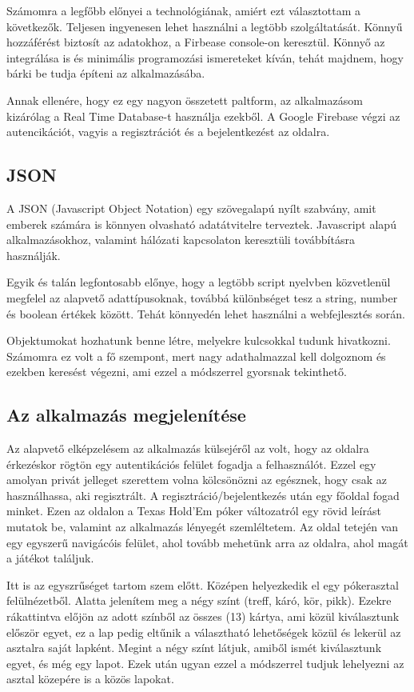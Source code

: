 Számomra a legfőbb előnyei a technológiának, amiért ezt választottam a következők. Teljesen ingyenesen lehet használni a legtöbb szolgáltatását. Könnyű hozzáférést biztosít az adatokhoz, a Firbease console-on keresztül. Könnyő az integrálása is és minimális programozási ismereteket kíván, tehát majdnem, hogy bárki be tudja építeni az alkalmazásába.

Annak ellenére, hogy ez egy nagyon összetett paltform, az alkalmazásom kizárólag a Real Time Database-t használja ezekből. A Google Firebase végzi az autencikációt, vagyis a regisztrációt és a bejelentkezést az oldalra.

\subsection{JSON}
A JSON (Javascript Object Notation) egy szövegalapú nyílt szabvány, amit emberek számára is könnyen olvasható adatátvitelre terveztek. Javascript alapú alkalmazásokhoz, valamint hálózati kapcsolaton keresztüli továbbításra használják. 

Egyik és talán legfontosabb előnye, hogy a legtöbb script nyelvben közvetlenül megfelel az alapvető adattípusoknak, továbbá különbséget tesz a string, number és boolean értékek között. Tehát könnyedén lehet használni a webfejlesztés során. 

Objektumokat hozhatunk benne létre, melyekre kulcsokkal tudunk hivatkozni. Számomra ez volt a fő szempont, mert nagy adathalmazzal kell dolgoznom és ezekben keresést végezni, ami ezzel a módszerrel gyorsnak tekinthető.


\subsection{Az alkalmazás megjelenítése}
Az alapvető elképzelésem az alkalmazás külsejéről az volt, hogy az oldalra érkezéskor rögtön egy autentikációs felület fogadja a felhasználót. Ezzel egy amolyan privát jelleget szerettem volna kölcsönözni az egésznek, hogy csak az használhassa, aki regisztrált. A regisztráció/bejelentkezés után egy főoldal fogad minket. Ezen az oldalon a Texas Hold'Em póker változatról egy rövid leírást mutatok be, valamint az alkalmazás lényegét szemléltetem. Az oldal tetején van egy egyszerű navigácóis felület, ahol tovább mehetünk arra az oldalra, ahol magát a játékot találjuk.

Itt is az egyszrűséget tartom szem előtt. Középen helyezkedik el egy pókerasztal felülnézetből. Alatta jelenítem meg a négy színt (treff, káró, kör, pikk). Ezekre rákattintva előjön az adott színből az összes (13) kártya, ami közül kiválasztunk először egyet, ez a lap pedig eltűnik a választható lehetőségek közül és lekerül az asztalra saját lapként. Megint a négy színt látjuk, amiből ismét kiválasztunk egyet, és még egy lapot. Ezek után ugyan ezzel a módszerrel tudjuk lehelyezni az asztal közepére is a közös lapokat.


